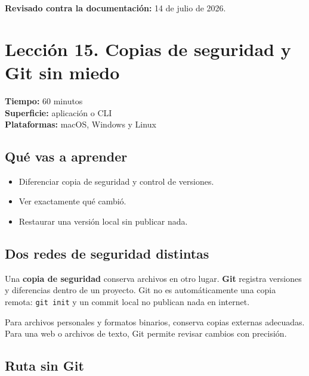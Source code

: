 \documentclass[10pt,a4paper,openany]{book}
\providecommand{\tightlist}{\setlength{\itemsep}{0.18em}\setlength{\parskip}{0pt}}
\begin{document}
\textbf{Revisado contra la documentación:} 14 de julio de 2026.

\clearpage

\section{Lección 15. Copias de seguridad y Git sin
miedo}\label{lecciuxf3n-15.-copias-de-seguridad-y-git-sin-miedo}

\begin{metabox}

\textbf{Tiempo:} 60 minutos\\
\textbf{Superficie:} aplicación o CLI\\
\textbf{Plataformas:} macOS, Windows y Linux

\end{metabox}

\subsection{Qué vas a aprender}\label{quuxe9-vas-a-aprender-14}

\begin{itemize}
\tightlist
\item
  Diferenciar copia de seguridad y control de versiones.
\item
  Ver exactamente qué cambió.
\item
  Restaurar una versión local sin publicar nada.
\end{itemize}

\subsection{Dos redes de seguridad
distintas}\label{dos-redes-de-seguridad-distintas}

Una \textbf{copia de seguridad} conserva archivos en otro lugar.
\textbf{Git} registra versiones y diferencias dentro de un proyecto. Git
no es automáticamente una copia remota: \texttt{git\ init} y un commit
local no publican nada en internet.

Para archivos personales y formatos binarios, conserva copias externas
adecuadas. Para una web o archivos de texto, Git permite revisar cambios
con precisión.

\subsection{Ruta sin Git}\label{ruta-sin-git}
\end{document}
